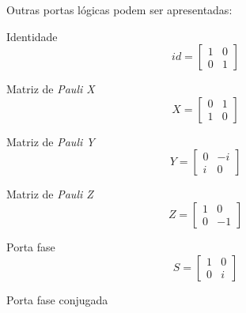    Outras portas lógicas podem ser apresentadas:
    \begin{enumerate}
    \begin{minipage}{0.5\textwidth}
        \item Identidade
        $$
            id=\left[\begin{array}{cc}
                 1 & 0 \\
                 0 & 1
            \end{array}\right]
        $$
    \end{minipage}
    \begin{minipage}{0.5\textwidth}
        \item Matriz de \textit{Pauli X}
        $$
            X=\left[\begin{array}{cc}
                 0 & 1 \\
                 1 & 0
            \end{array}\right]
        $$
    \end{minipage}
    \begin{minipage}{0.5\textwidth}
        \item Matriz de \textit{Pauli Y}
        $$
            Y=\left[\begin{array}{cc}
                 0 & -i \\
                 i & 0
            \end{array}\right]
        $$
    \end{minipage}
    \begin{minipage}{0.5\textwidth}
        \item Matriz de \textit{Pauli Z}
        $$
            Z=\left[\begin{array}{cc}
                 1 & 0 \\
                 0 & -1
            \end{array}\right]
        $$
    \end{minipage}
    \begin{minipage}{0.5\textwidth}
        \item Porta fase
        $$
            S=\left[\begin{array}{cc}
                 1 & 0 \\
                 0 & i
            \end{array}\right]
        $$
    \end{minipage}
    \begin{minipage}{0.5\textwidth}
        \item Porta fase conjugada

\end{minipage}
\end{enumerate}
